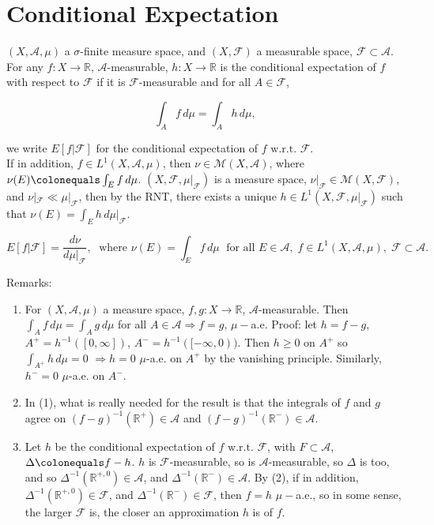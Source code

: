 \documentclass[12pt]{article}
\newcommand{\fall}[0] { \textrm{ for all } }
\newcommand{\wrt}[0] { \textrm{ w.r.t. } }
\newcommand{\where}[0] { \textrm{ where } }
\newcommand{\rimply}[0] { \Rightarrow }
\newcommand{\rarw}[0] { \rightarrow }
\newcommand{ \defeq }[0] { \colonequals }
\newcommand{\reals}[0] { \mathbb{R}}
\newcommand{\A}[0] { \mathcal{A} }
\newcommand{\F}[0] { \mathcal{F} }
\newcommand{\M}[0] { \mathcal{M} }
\begin{document}












\section*{ Conditional Expectation }

$(X, \A, \mu)$ a $\sigma$-finite measure space, and $(X, \F)$ a measurable space, $\F \subset \A$. For any $f: X \rarw \reals$, $\A$-measurable, $h:X \rarw \reals$ is the conditional expectation of $f$ with respect to $\F$ if it is $\F$-measurable and for all $A \in \F$,

$$
\int_A f \, d\mu = \int_A h\, d\mu,
$$

\noindent we write $E[f|\F]$ for the conditional expectation of $f \wrt \F$. \\


\noindent
If in addition, $f \in L^1(X, \A, \mu)$, then $\nu \in \M(X, \A)$, where $\nu(E) \defeq \int_E f \, d\mu$. $(X, \F, \mu|_\F)$ is a measure space, $\nu|_\F \in \M(X, \F)$, and $ \nu|_\F \ll \mu|_\F$, then by the RNT, there exists a unique $h \in L^1(X, \F, \mu|_\F)$ such that $\nu(E) = \int_E h \, d\mu|_\F$.

$$
E[f|\F] = \frac{d \nu}{d\mu|_\F}, \; \where \nu(E) = \int_E f \, d\mu \; \fall E \in \A, \; f \in L^1(X, \A, \mu),\; \F \subset \A.
$$

Remarks:

\begin{enumerate}
\item
For $(X, \A, \mu)$ a measure space, $f,g: X \rarw \reals$, $\A$-measurable. Then $ \int_A f \,d\mu = \int_A g \, d\mu$ for all $A \in \A \rimply f = g$, $\mu-$a.e. Proof: let $h = f - g$, $A^+ = h^{-1}( [0,\infty] )$, $A^- = h^{-1}( [-\infty,0) )$. Then $h \ge 0$ on $A^+$ so $\int_{A^+} h \,d\mu = 0$ $\rimply h=0$ $\mu$-a.e. on $A^+$ by the vanishing principle. Similarly, $h^- = 0$ $\mu$-a.e. on $A^-$.
\item
In (1), what is really needed for the result is that the integrals of $f$ and $g$ agree on $(f-g)^{-1} (\reals^+) \in \A$ and $(f-g)^{-1} (\reals^-) \in \A$.
\item Let $h$ be the conditional expectation of $f \wrt \F$, with $F \subset \A$, $\Delta \defeq f-h$. $h$ is $\F$-measurable, so is $\A$-measurable, so $\Delta$ is too, and so $\Delta^{-1}(\reals^{+,0}) \in \A$, and $\Delta^{-1}(\reals^{-}) \in \A$. By (2), if in addition, $\Delta^{-1}(\reals^{+,0}) \in \F$, and $\Delta^{-1}(\reals^{-}) \in \F$, then $f=h$ $\mu-$a.e., so in some sense, the larger $\F$ is, the closer an approximation $h$ is of $f$.
\end{enumerate}
\end{document}
